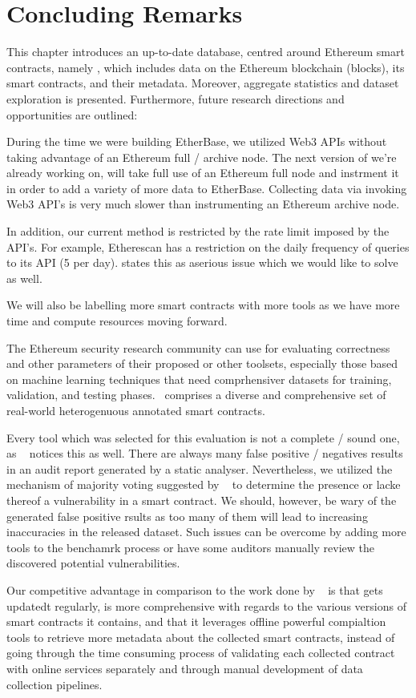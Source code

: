 \section{Concluding Remarks}
	This chapter introduces an up-to-date database, centred around Ethereum smart contracts, namely \etherbase, which includes data on the Ethereum blockchain (blocks),
	its smart contracts, and their metadata.
	Moreover, aggregate statistics and dataset exploration is presented.
	Furthermore, future research directions and opportunities are outlined:

	During the time we were building EtherBase, we utilized Web3 APIs without taking advantage of an Ethereum full / archive node.
	The next version of \etherbase we're already working on, will take full use of an Ethereum full node and instrment it in order to add a variety of more data to EtherBase.
	Collecting data via invoking Web3 API's is very much slower than instrumenting an Ethereum archive node.
	
	In addition, our current method is restricted by the rate limit imposed by the API's.
	For example, Etherescan has a restriction on the daily frequency of queries to its API (5 per day).
	\cite{yashavant2022scrawld} states this as aserious issue which we would like to solve as well.

	We will also be labelling more smart contracts with more tools as we have more time and compute resources moving forward.

	The Ethereum security research community can use \etherbase for evaluating correctness and other parameters of their proposed or other toolsets,
	especially those based on machine learning techniques that need comprhensiver datasets for training, validation, and testing phases.
	\etherbase~comprises a diverse and comprehensive set of real-world heterogenuous annotated smart contracts.
	
	Every tool which was selected for this evaluation is not a complete / sound one, as ~\cite{yashavant2022scrawld} notices this as well.
	There are always many false positive / negatives results in an audit report generated by a static analyser.
	Nevertheless, we utilized the mechanism of majority voting suggested by ~\cite{yashavant2022scrawld}
	to determine the presence or lacke thereof a vulnerability in a smart contract.
	We should, however, be wary of the generated false positive rsults as too many of them will lead to increasing inaccuracies in the released dataset.
	Such issues can be overcome by adding more tools to the benchamrk process or have some auditors manually review the discovered potential vulnerabilities.
	
	Our competitive advantage in comparison to the work done by ~\cite{yashavant2022scrawld} is that \etherbase gets updatedt regularly, is more comprehensive with regards to the various versions of smart contracts it contains,
	and that it leverages offline powerful compialtion tools to retrieve more metadata about the collected smart contracts, instead of going through the time consuming process of validating each collected contract with online services separately and through manual development of data collection pipelines.